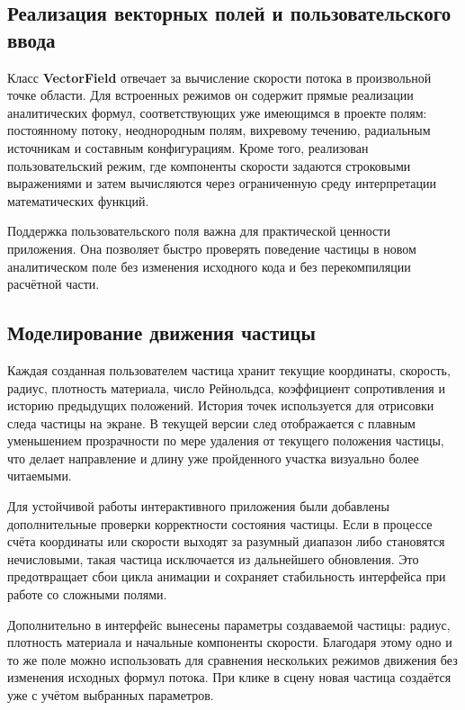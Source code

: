 \documentclass[14pt,a4paper]{extarticle}
\numberwithin{figure}{section}
\numberwithin{table}{section}
\begin{document}
\subsection{Реализация векторных полей и пользовательского ввода}

Класс \textbf{VectorField} отвечает за вычисление скорости потока в произвольной
точке области. Для встроенных режимов он содержит прямые реализации аналитических
формул, соответствующих уже имеющимся в проекте полям: постоянному потоку,
неоднородным полям, вихревому течению, радиальным источникам и составным
конфигурациям. Кроме того, реализован пользовательский режим, где компоненты
скорости задаются строковыми выражениями и затем вычисляются через ограниченную
среду интерпретации математических функций.

Поддержка пользовательского поля важна для практической ценности приложения.
Она позволяет быстро проверять поведение частицы в новом аналитическом поле
без изменения исходного кода и без перекомпиляции расчётной части.

\subsection{Моделирование движения частицы}

Каждая созданная пользователем частица хранит текущие координаты, скорость,
радиус, плотность материала, число Рейнольдса, коэффициент сопротивления и
историю предыдущих положений. История точек используется для отрисовки следа
частицы на экране. В текущей версии след отображается с плавным уменьшением
прозрачности по мере удаления от текущего положения частицы, что делает
направление и длину уже пройденного участка визуально более читаемыми.

Для устойчивой работы интерактивного приложения были добавлены дополнительные
проверки корректности состояния частицы. Если в процессе счёта координаты или
скорости выходят за разумный диапазон либо становятся нечисловыми, такая частица
исключается из дальнейшего обновления. Это предотвращает сбои цикла анимации и
сохраняет стабильность интерфейса при работе со сложными полями.

Дополнительно в интерфейс вынесены параметры создаваемой частицы: радиус,
плотность материала и начальные компоненты скорости. Благодаря этому одно и то
же поле можно использовать для сравнения нескольких режимов движения без
изменения исходных формул потока. При клике в сцену новая частица создаётся уже
с учётом выбранных параметров.
\end{document}
